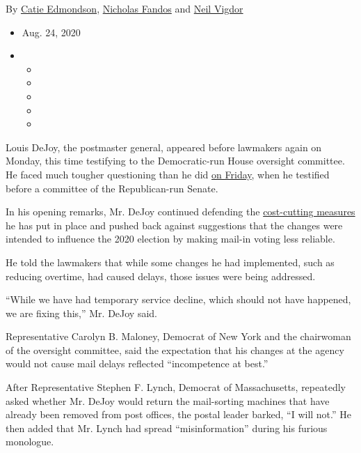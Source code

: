 By \href{https://www.nytimes3xbfgragh.onion/by/catie-edmondson}{Catie
Edmondson},
\href{https://www.nytimes3xbfgragh.onion/by/nicholas-fandos}{Nicholas
Fandos} and
\href{https://www.nytimes3xbfgragh.onion/by/neil-vigdor}{Neil Vigdor}

\begin{itemize}
\item
  Aug. 24, 2020
\item
  \begin{itemize}
  \item
  \item
  \item
  \item
  \item
  \end{itemize}
\end{itemize}

Louis DeJoy, the postmaster general, appeared before lawmakers again on
Monday, this time testifying to the Democratic-run House oversight
committee. He faced much tougher questioning than he did
\href{https://www.nytimes3xbfgragh.onion/2020/08/21/us/politics/dejoy-postal-service-senate-hearing.html}{on
Friday}, when he testified before a committee of the Republican-run
Senate.

In his opening remarks, Mr. DeJoy continued defending the
\href{https://www.nytimes3xbfgragh.onion/2020/08/15/us/post-office-vote-by-mail.html}{cost-cutting
measures} he has put in place and pushed back against suggestions that
the changes were intended to influence the 2020 election by making
mail-in voting less reliable.

He told the lawmakers that while some changes he had implemented, such
as reducing overtime, had caused delays, those issues were being
addressed.

``While we have had temporary service decline, which should not have
happened, we are fixing this,'' Mr. DeJoy said.

Representative Carolyn B. Maloney, Democrat of New York and the
chairwoman of the oversight committee, said the expectation that his
changes at the agency would not cause mail delays reflected
``incompetence at best.''

After Representative Stephen F. Lynch, Democrat of Massachusetts,
repeatedly asked whether Mr. DeJoy would return the mail-sorting
machines that have already been removed from post offices, the postal
leader barked, ``I will not.'' He then added that Mr. Lynch had spread
``misinformation'' during his furious monologue.

